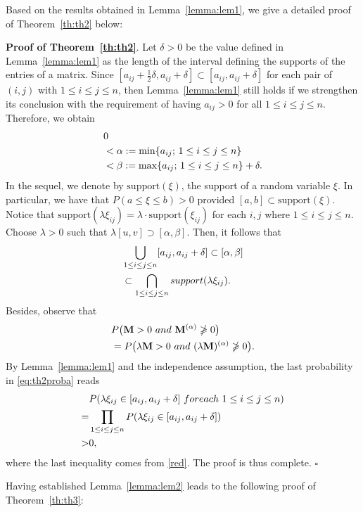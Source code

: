 \documentclass[conference,letterpaper]{IEEEtran}
\numberwithin{equation}{section}
\newcommand{\lbl}{\label}
\newcommand{\bd}{\bold}
\newcommand{\bea}{\begin{eqnarray}}
\newcommand{\eea}{\end{eqnarray}}
\begin{document}
Based on the results obtained in Lemma~\ref{lemma:lem1}, we give a detailed proof of Theorem~\ref{th:th2} below:

\noindent\textbf{Proof of Theorem~\ref{th:th2}}. Let $\delta >0$ be the value defined in Lemma~\ref{lemma:lem1} as the length of the interval defining the supports of the entries of a matrix. 
Since $[a_{ij}+\frac{1}{2}\delta, a_{ij}+\delta] \subset [a_{ij}, a_{ij}+\delta]$  for each pair of $(i, j)$ with $1\leq i\leq j \leq n$, then Lemma~\ref{lemma:lem1} still holds if we strengthen its conclusion with the requirement of having $a_{ij}>0$ for all $1\leq i\leq j \leq n$.
Therefore, we obtain
\bea\lbl{poker}
&0\\\notag
&<\alpha:=\min\{a_{ij};\, 1\leq i\leq j \leq n\}\\\notag
& < \beta:=\max\{a_{ij};\, 1\leq i\leq j \leq n\}+\delta.\notag
\eea
In the sequel, we denote by $\mbox{support}(\xi)$, the support of a random variable $\xi$.
In particular, we have that $P(a\leq \xi\leq  b)>0$ provided $[a, b]\subset \mbox{support}(\xi)$.
Notice that $\mbox{support}(\lambda\xi_{ij})=\lambda\cdot \mbox{support}(\xi_{ij})$ for each $i, j$ where $1\leq i\leq j \leq n$. 
Choose $\lambda>0$ such that $\lambda [u, v]\supset [\alpha , \beta]$. 
Then, it follows that
\bea\lbl{red}
& \bigcup_{1\leq i\leq  j\leq n}[a_{ij}, a_{ij}+\delta] \subset [\alpha, \beta]\\\notag
& \subset \bigcap_{1\leq i\leq  j\leq n}  \mbox{support}(\lambda\xi_{ij}).\notag
\eea
Besides, observe that
\bea\label{eq:th2proba}
& P\big(\bd{M}>0\ \mbox{and}\ \bd{M}^{(\alpha)}\ngeqslant 0\big)\\\notag
& = P\big(\lambda\bd{M}>0\ \mbox{and}\ (\lambda\bd{M})^{(\alpha)}\ngeqslant 0\big).\notag
\eea
By Lemma~\ref{lemma:lem1} and the independence assumption, the last probability in \eqref{eq:th2proba} reads
\begin{align}\notag
& P(\lambda \xi_{ij}\in [a_{ij}, a_{ij}+\delta]\ \mbox{for each}\ 1\leq i\leq j \leq n)\\\notag
=& \prod_{1\leq i\leq j \leq n}P(\lambda\xi_{ij}\in [a_{ij}, a_{ij}+\delta])\\\notag
>& 0,\notag
\end{align}
where the last inequality comes from \eqref{red}. 
The proof is thus complete. \hfill$\square$

\medskip



Having established Lemma~\ref{lemma:lem2} leads to the following proof of Theorem~\ref{th:th3}:
\end{document}
